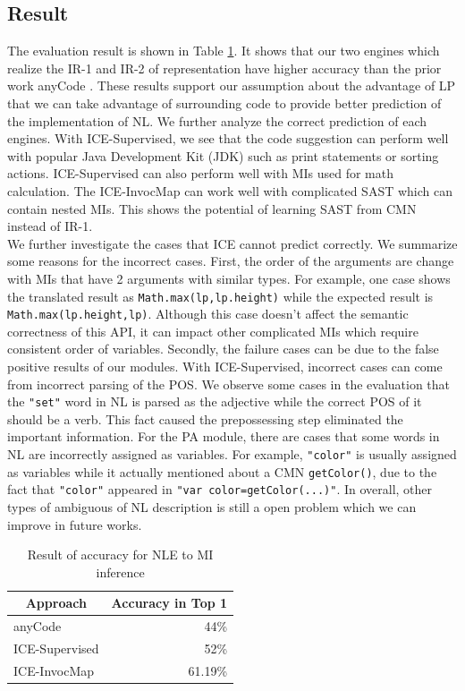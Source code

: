 \documentclass[sigconf,review]{acmart}
\begin{document}
\subsection{Result}
The evaluation result is shown in Table \ref{tblAccuracy}. It shows that our two engines which realize the IR-1 and IR-2 of representation have higher accuracy than the prior work anyCode \cite{007}. These results support our assumption about the advantage of LP that we can take advantage of surrounding code to provide better prediction of the implementation of NL.
We further analyze the correct prediction of each engines. With ICE-Supervised, we see that the code suggestion can perform well with popular Java Development Kit (JDK) such as print statements or sorting actions. ICE-Supervised can also perform well with MIs used for math calculation. The ICE-InvocMap can work well with complicated SAST which can contain nested MIs. This shows the potential of learning SAST from CMN instead of IR-1. 
\\
We further investigate the cases that ICE cannot predict correctly. We summarize some reasons for the incorrect cases. First, the order of the arguments are change with MIs that have 2 arguments with similar types. For example, one case shows the translated result as \texttt{Math.max(lp,lp.height)} while the expected result is \texttt{Math.max(lp.height,lp)}. Although this case doesn't affect the semantic correctness of this API, it can impact other complicated MIs which require consistent order of variables. Secondly, the failure cases can be due to the false positive results of our modules. With ICE-Supervised, incorrect cases can come from incorrect parsing of the POS. We observe some cases in the evaluation that the \texttt{"set"} word in NL is parsed as the adjective while the correct POS of it should be a verb. This fact caused the prepossessing step eliminated the important information. For the PA module, there are cases that some words in NL are incorrectly assigned as variables. For example, \texttt{"color"} is usually assigned as variables while it actually mentioned about a CMN \texttt{getColor()}, due to the fact that \texttt{"color"} appeared in \texttt{"var color=getColor(...)"}. In overall, other types of ambiguous of NL description is still a open problem which we can improve in future works.

\begin{table}[H]
\small
\caption{Result of accuracy for NLE to MI inference}
\label{tblAccuracy}
\centering
\begin{tabular}{|l|r|}
\hline
\multicolumn{1}{|c|}{\textbf{Approach}} & \multicolumn{1}{c|}{\textbf{Accuracy in Top 1}} \\ \hline
anyCode                                 & 44\%                                            \\ \hline
ICE-Supervised                                & 52\%                                         \\ \hline
ICE-InvocMap                                & 61.19\%                                         \\ \hline
\end{tabular}
\end{table}
\end{document}

